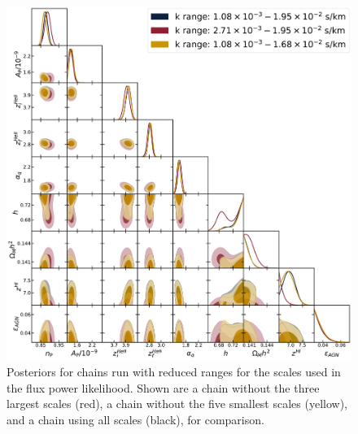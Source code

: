 \documentclass[a4paper,11pt]{article}
\begin{document}
\begin{figure}
    \centering
    \includegraphics[width=\textwidth]{figures/kscale_corner.pdf}
    \caption{\label{fig:krange}
    Posteriors for chains run with reduced ranges for the scales used in the flux power likelihood.
    Shown are a chain without the three largest scales (red), a chain without the five smallest scales (yellow), and a chain using all scales (black), for comparison.
    }
\end{figure}




\end{document}
